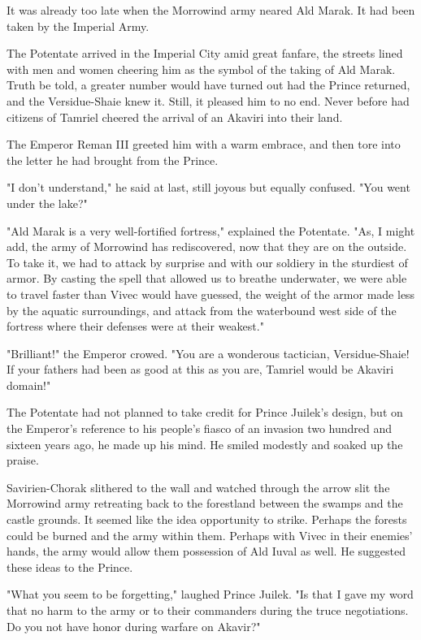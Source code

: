 It was already too late when the Morrowind army neared Ald Marak. It had been taken by the Imperial Army.

The Potentate arrived in the Imperial City amid great fanfare, the streets lined with men and women cheering him as the symbol of the taking of Ald Marak. Truth be told, a greater number would have turned out had the Prince returned, and the Versidue-Shaie knew it. Still, it pleased him to no end. Never before had citizens of Tamriel cheered the arrival of an Akaviri into their land.

The Emperor Reman III greeted him with a warm embrace, and then tore into the letter he had brought from the Prince.

"I don't understand," he said at last, still joyous but equally confused. "You went under the lake?"

"Ald Marak is a very well-fortified fortress," explained the Potentate. "As, I might add, the army of Morrowind has rediscovered, now that they are on the outside. To take it, we had to attack by surprise and with our soldiery in the sturdiest of armor. By casting the spell that allowed us to breathe underwater, we were able to travel faster than Vivec would have guessed, the weight of the armor made less by the aquatic surroundings, and attack from the waterbound west side of the fortress where their defenses were at their weakest."

"Brilliant!" the Emperor crowed. "You are a wonderous tactician, Versidue-Shaie! If your fathers had been as good at this as you are, Tamriel would be Akaviri domain!"

The Potentate had not planned to take credit for Prince Juilek's design, but on the Emperor's reference to his people's fiasco of an invasion two hundred and sixteen years ago, he made up his mind. He smiled modestly and soaked up the praise.

Savirien-Chorak slithered to the wall and watched through the arrow slit the Morrowind army retreating back to the forestland between the swamps and the castle grounds. It seemed like the idea opportunity to strike. Perhaps the forests could be burned and the army within them. Perhaps with Vivec in their enemies' hands, the army would allow them possession of Ald Iuval as well. He suggested these ideas to the Prince.

"What you seem to be forgetting," laughed Prince Juilek. "Is that I gave my word that no harm to the army or to their commanders during the truce negotiations. Do you not have honor during warfare on Akavir?"

